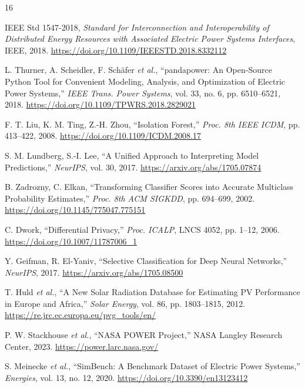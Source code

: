 \documentclass[12pt, a4paper]{article}
\begin{document}

\begin{thebibliography}{16}

IEEE Std 1547-2018, \emph{Standard for Interconnection and Interoperability of Distributed Energy Resources with Associated Electric Power Systems Interfaces}, IEEE, 2018. \url{https://doi.org/10.1109/IEEESTD.2018.8332112}

L. Thurner, A. Scheidler, F. Schäfer \emph{et al.}, ``pandapower: An Open-Source Python Tool for Convenient Modeling, Analysis, and Optimization of Electric Power Systems,'' \emph{IEEE Trans. Power Systems}, vol. 33, no. 6, pp. 6510--6521, 2018. \url{https://doi.org/10.1109/TPWRS.2018.2829021}

F. T. Liu, K. M. Ting, Z.-H. Zhou, ``Isolation Forest,'' \emph{Proc. 8th IEEE ICDM}, pp. 413--422, 2008. \url{https://doi.org/10.1109/ICDM.2008.17}

S. M. Lundberg, S.-I. Lee, ``A Unified Approach to Interpreting Model Predictions,'' \emph{NeurIPS}, vol. 30, 2017. \url{https://arxiv.org/abs/1705.07874}

B. Zadrozny, C. Elkan, ``Transforming Classifier Scores into Accurate Multiclass Probability Estimates,'' \emph{Proc. 8th ACM SIGKDD}, pp. 694--699, 2002. \url{https://doi.org/10.1145/775047.775151}

C. Dwork, ``Differential Privacy,'' \emph{Proc. ICALP}, LNCS 4052, pp. 1--12, 2006. \url{https://doi.org/10.1007/11787006_1}

Y. Geifman, R. El-Yaniv, ``Selective Classification for Deep Neural Networks,'' \emph{NeurIPS}, 2017. \url{https://arxiv.org/abs/1705.08500}

T. Huld \emph{et al.}, ``A New Solar Radiation Database for Estimating PV Performance in Europe and Africa,'' \emph{Solar Energy}, vol. 86, pp. 1803--1815, 2012. \url{https://re.jrc.ec.europa.eu/pvg_tools/en/}

P. W. Stackhouse \emph{et al.}, ``NASA POWER Project,'' NASA Langley Research Center, 2023. \url{https://power.larc.nasa.gov/}

S. Meinecke \emph{et al.}, ``SimBench: A Benchmark Dataset of Electric Power Systems,'' \emph{Energies}, vol. 13, no. 12, 2020. \url{https://doi.org/10.3390/en13123412}


\end{thebibliography}
\end{document}
